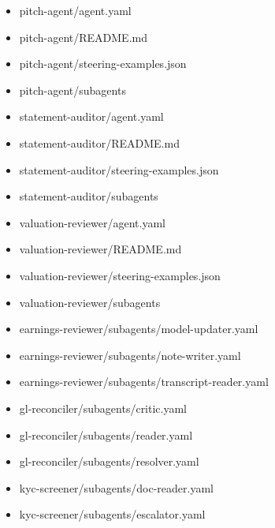 \documentclass[11pt]{article}
\begin{document}
\begin{itemize}[leftmargin=*,itemsep=1pt,topsep=2pt]
\item \hspace*{0.9em}pitch-agent/agent.yaml
\item \hspace*{0.9em}pitch-agent/README.md
\item \hspace*{0.9em}pitch-agent/steering-examples.json
\item \hspace*{0.9em}pitch-agent/subagents
\item \hspace*{0.9em}statement-auditor/agent.yaml
\item \hspace*{0.9em}statement-auditor/README.md
\item \hspace*{0.9em}statement-auditor/steering-examples.json
\item \hspace*{0.9em}statement-auditor/subagents
\item \hspace*{0.9em}valuation-reviewer/agent.yaml
\item \hspace*{0.9em}valuation-reviewer/README.md
\item \hspace*{0.9em}valuation-reviewer/steering-examples.json
\item \hspace*{0.9em}valuation-reviewer/subagents
\item \hspace*{1.8em}earnings-reviewer/subagents/model-updater.yaml
\item \hspace*{1.8em}earnings-reviewer/subagents/note-writer.yaml
\item \hspace*{1.8em}earnings-reviewer/subagents/transcript-reader.yaml
\item \hspace*{1.8em}gl-reconciler/subagents/critic.yaml
\item \hspace*{1.8em}gl-reconciler/subagents/reader.yaml
\item \hspace*{1.8em}gl-reconciler/subagents/resolver.yaml
\item \hspace*{1.8em}kyc-screener/subagents/doc-reader.yaml
\item \hspace*{1.8em}kyc-screener/subagents/escalator.yaml

\end{itemize}
\end{document}
